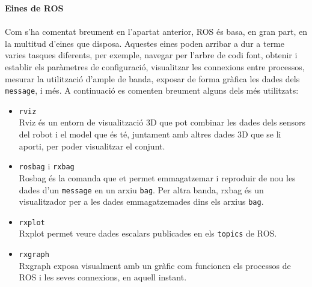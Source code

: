 \documentclass[12pt,a4paper,final,twoside]{article}
\begin{document}
\vspace{20pt}
\textbf{Eines de ROS}
\paragraph{}Com s'ha comentat breument en l'apartat anterior, ROS és basa, en gran part, en la multitud d'eines que disposa. Aquestes eines poden arribar a dur a terme varies tasques diferents, per exemple, navegar per l'arbre de codi font, obtenir i establir els paràmetres de configuració, visualitzar les connexions entre processos, mesurar la utilització d'ample de banda, exposar de forma gràfica les dades dels \texttt{message}, i més. A continuació es comenten breument alguns dels més utilitzats:
\begin{itemize}
\item \texttt{rviz}\\
Rviz és un entorn de visualització 3D que pot combinar les dades dels sensors del robot i el model que és té, juntament amb altres dades 3D que se li aporti, per poder visualitzar el conjunt.

\item \texttt{rosbag} i \texttt{rxbag}\\
Rosbag és la comanda que et permet emmagatzemar i reproduir de nou les dades d'un \texttt{message} en un arxiu \texttt{bag}. Per altra banda, rxbag és un visualitzador per a les dades emmagatzemades dins els arxius \texttt{bag}.

\item \texttt{rxplot}\\
Rxplot permet veure dades escalars publicades en els \texttt{topics} de ROS.

\item \texttt{rxgraph}\\
Rxgraph exposa visualment amb un gràfic com funcionen els processos de ROS i les seves connexions, en aquell instant.

\end{itemize}

\end{document}
